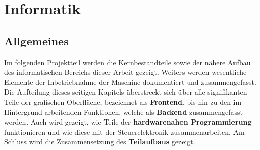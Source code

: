 \chapter{Informatik}\label{ch:informatik}
\section{Allgemeines}\label{sec:einleitung}
Im folgenden Projektteil werden die Kernbestandteile sowie der nähere Aufbau des informatischen Bereichs dieser Arbeit gezeigt.
Weiters werden wesentliche Elemente der Inbetriebnahme der Maschine dokumentiert und zusammengefasst.
Die Aufteilung dieses \pageref{LastPage} seitigen Kapitels überstreckt sich über alle signifikanten Teile der grafischen Oberfläche, bezeichnet als \textbf{Frontend}, bis hin zu den im Hintergrund arbeitenden Funktionen, welche als \textbf{Backend} zusammengefasst werden.
Auch wird gezeigt, wie Teile der \textbf{hardwarenahen Programmierung} funktionieren und wie diese mit der Steuerelektronik zusammenarbeiten.
Am Schluss wird die Zusammensetzung des \textbf{Teilaufbaus} gezeigt.
